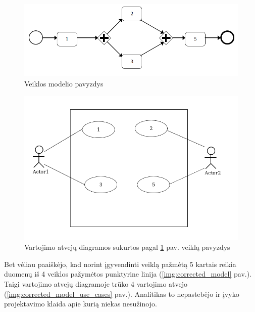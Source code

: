 \documentclass{VUMIFInfBakalaurinis}
\begin{document}
\begin{figure}[H]
	\centering
	\includegraphics[width=\textwidth]{img/bad_modeling/bad_model}
	\caption{Veiklos modelio pavyzdys}
	\label{img:bad_model}
\end{figure}
\begin{figure}[H]
	\centering
	\includegraphics[width=15cm]{img/bad_modeling/bad_model_use_cases}
	\caption{Vartojimo atvejų diagramos sukurtos pagal \ref{img:bad_model} pav. veiklą pavyzdys}
	\label{img:bad_model_use_cases}
\end{figure}

Bet vėliau paaiškėjo, kad norint įgyvendinti veiklą pažmėtą 5 kartais reikia duomenų iš 4 veiklos pažymėtos punktyrine linija (\ref{img:corrected_model} pav.). Taigi vartojimo atvejų diagramoje trūko 4 vartojimo atvejo (\ref{img:corrected_model_use_cases} pav.). Analitikas to nepastebėjo ir įvyko projektavimo klaida apie kurią niekas nesužinojo.
\end{document}
